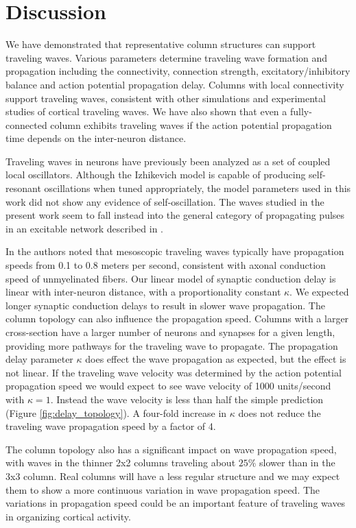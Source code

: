 \documentclass[a4paper,11pt]{article}
\begin{document}
\section{Discussion}
We have demonstrated that representative column structures can support traveling waves.
Various parameters determine traveling wave formation and propagation including the connectivity, connection strength, excitatory/inhibitory balance and action potential propagation delay.
Columns with local connectivity support traveling waves, consistent with other simulations and experimental studies of cortical traveling waves.
We have also shown that even a fully-connected column exhibits traveling waves if the action potential propagation time depends on the inter-neuron distance. 

Traveling waves in neurons have previously been analyzed as a set of coupled local oscillators.
Although the Izhikevich model is capable of producing self-resonant oscillations when tuned appropriately, the model parameters used in this work did not show any evidence of self-oscillation.
The waves studied in the present work seem to fall instead into the general category of propagating pulses in an excitable network described in \cite{ermentrout2001}. 

In \cite{muller2018} the authors noted that mesoscopic traveling waves typically have propagation speeds from 0.1 to 0.8 meters per second, consistent with axonal conduction speed of unmyelinated fibers.
Our linear model of synaptic conduction delay is linear with inter-neuron distance, with a proportionality constant $\kappa$.
We expected longer synaptic conduction delays to result in slower wave propagation.
The column topology can also influence the propagation speed.
Columns with a larger cross-section have a larger number of neurons and synapses for a given length, providing more pathways for the traveling wave to propagate.
The propagation delay parameter $\kappa$ does effect the wave propagation as expected, but the effect is not linear.
If the traveling wave velocity was determined by the action potential propagation speed we would expect to see wave velocity of 1000 units/second with $\kappa=1$.
Instead the wave velocity is less than half the simple prediction (Figure \ref{fig:delay_topology}).
A four-fold increase in $\kappa$ does not reduce the traveling wave propagation speed by a factor of 4. 

The column topology also has a significant impact on wave propagation speed, with waves in the thinner 2x2 columns traveling about $25\%$ slower than in the 3x3 column.
Real columns will have a less regular structure and we may expect them to show a more continuous variation in wave propagation speed. 
The variations in propagation speed could be an important feature of traveling waves in organizing cortical activity.
\end{document}
